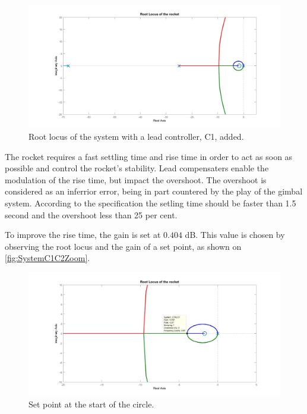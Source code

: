 \begin{figure}[htbp]
\centering
\includegraphics[width=\textwidth]{figures/Rocket/design/tf_with_controller_final_general}
\caption{Root locus of the system with a lead controller, C1, added.}
\label{fig:SystemC1}
\end{figure}

The rocket requires a fast settling time and rise time in order to act as soon as possible and control the rocket's stability. Lead compensaters enable the modulation of the rise time, but impact the overshoot. The overshoot is considered as an inferrior error, being in part countered by the play of the gimbal system. 
According to the specification the setling time should be faster than 1.5 second and the overshoot less than 25 per cent.

To improve the rise time, the gain is set at $0.404$ \si{\dB}. This value is chosen by observing the root locus and the gain of a set point, as shown on \autoref{fig:SystemC1C2Zoom}.  

\begin{figure}[htbp]
	\centering
	
	\includegraphics[width=\textwidth]{figures/Rocket/design/tf_with_controller_final}
	\caption{Set point at the start of the circle.}
	\label{fig:SystemC1C2Zoom}
	
\end{figure}

